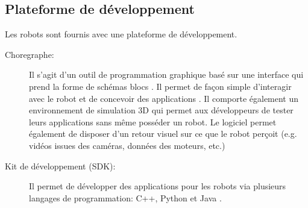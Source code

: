 \subsection{Plateforme de développement}
\label{Entreprise:Les produits: Nao: Plateforme de développement}
Les robots sont fournis avec une plateforme de développement.
\begin{description}
	\item[Choregraphe:] Il s'agit d'un outil de programmation graphique basé sur une interface qui prend la forme de schémas blocs \cite{ChoregrapheTech}. Il permet de façon simple d'interagir avec le robot et de concevoir des applications . Il comporte également un environnement de simulation 3D qui permet aux développeurs de tester leurs applications sans même posséder un robot. Le logiciel permet également de disposer d'un retour visuel sur ce que le robot perçoit (e.g. vidéos issues des caméras, données des moteurs, etc.) 
	
	\item[Kit de développement (SDK):] Il permet de développer des applications pour les robots via plusieurs langages de programmation:  C++, Python et Java \cite{SDKTech}.
\end{description}

